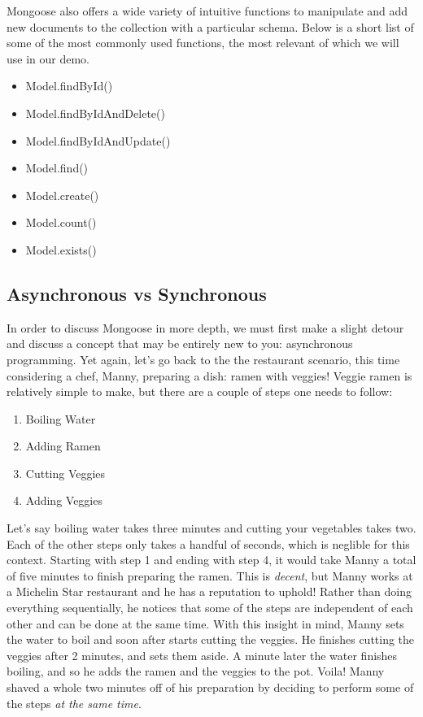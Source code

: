 Mongoose also offers a wide variety of intuitive functions to manipulate and add new documents to the collection with a particular schema. Below is a short list of some of the most commonly used functions, the most relevant of which we will use in our demo.

\begin{itemize}
    \item Model.findById()
    \item Model.findByIdAndDelete()
    \item Model.findByIdAndUpdate()
    \item Model.find()
    \item Model.create()
    \item Model.count()
    \item Model.exists()
\end{itemize}

\subsection*{Asynchronous vs Synchronous}

In order to discuss Mongoose in more depth, we must first make a slight detour and discuss a concept that may be entirely new to you: asynchronous programming. Yet again, let's go back to the the restaurant scenario, this time considering a chef, Manny, preparing a dish: ramen with veggies! Veggie ramen is relatively simple to make, but there are a couple of steps one needs to follow:

\begin{enumerate}
    \item Boiling Water
    \item Adding Ramen
    \item Cutting Veggies
    \item Adding Veggies
\end{enumerate}

Let's say boiling water takes three minutes and cutting your vegetables takes two. Each of the other steps only takes a handful of seconds, which is neglible for this context. Starting with step 1 and ending with step 4, it would take Manny a total of five minutes to finish preparing the ramen. This is \emph{decent}, but Manny works at a Michelin Star restaurant and he has a reputation to uphold! Rather than doing everything sequentially, he notices that some of the steps are independent of each other and can be done at the same time. With this insight in mind, Manny sets the water to boil and soon after starts cutting the veggies. He finishes cutting the veggies after 2 minutes, and sets them aside. A minute later the water finishes boiling, and so he adds the ramen and the veggies to the pot. Voila! Manny shaved a whole two minutes off of his preparation by deciding to perform some of the steps \emph{at the same time}. 

